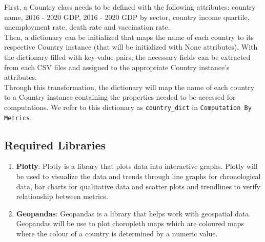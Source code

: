 \documentclass[fontsize=11pt]{article}
\begin{document}
    \noindent First, a Country class needs to be defined  with the following attributes:  country name, 2016 - 2020 GDP, 2016 - 2020 GDP by sector, country income quartile, unemployment rate, death rate and vaccination rate. \\

    \noindent Then, a dictionary can be initialized that maps the name of each country to its respective Country instance (that will be initialized with None attributes). With the dictionary filled with key-value pairs, the necessary fields can be extracted from each CSV files and assigned to the appropriate Country instance’s attributes. \\

    \noindent Through this transformation, the dictionary will map the name of each country to a Country instance containing the properties needed to be accessed for computations. We refer to this dictionary as \texttt{country\_dict} in \texttt{Computation By Metrics}.\\

    \subsection*{Required Libraries}
    \begin{enumerate}
        \item \textbf{Plotly}: Plotly is a library that plots data into interactive graphs. Plotly will be used to visualize the data and trends through line graphs for chronological data, bar charts for qualitative data and scatter plots and trendlines to verify relationship between metrics.
        \item \textbf{Geopandas}: Geopandas is a library that helps work with geospatial data. Geopandas will be use to plot choropleth maps which are coloured maps where the colour of a country is determined by a numeric value.
    \end{enumerate}
\end{document}
